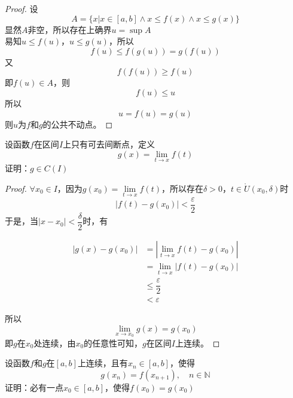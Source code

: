 \begin{proof}

    设
    \[A = \{x| x \in [a, b] \land x \leq f(x) \land x \leq g(x)\}\]
    显然\(A\)非空，所以存在上确界\( u = \sup{A}\) \\
    易知\(u \leq f(u)\)，\(u \leq g(u)\)，所以            
    \[f(u) \leq f(g(u)) = g(f(u))\] 
    又
    \[f(f(u)) \geq f(u)\]
    即\(f(u) \in A\)，则
    \[f(u) \leq u\]
    所以
    \[u = f(u) = g(u)\]
    则\(u\)为\(f\)和\(g\)的公共不动点。

\end{proof}

\begin{proposition}
    
    设函数\(f\)在区间\(I\)上只有可去间断点，定义
    \[g(x) = \lim\limits_{t \to x}{f(t)}\]
    证明：\(g \in C(I)\)

\end{proposition}

\begin{proof}

    \(\forall x_0 \in I\)，因为\(g(x_0) = \lim\limits_{t \to x}{f(t)}\)，所以存在\(\delta > 0\)，\(t \in \mathring{U}(x_0, \delta)\)时
    \[|f(t) - g(x_0)| < \dfrac{\varepsilon}{2}\]
    于是，当\(|x - x_0| < \dfrac{\delta}{2}\)时，有

    \begin{align*}
        |g(x) - g(x_0)| & = \left| \lim\limits_{t \to x}{f(t) - g(x_0)} \right| \\
        & = \lim\limits_{t \to x}{|f(t) - g(x_0)|} \\
        & \leq \dfrac{\varepsilon}{2} \\
        & < \varepsilon 
    \end{align*}

    所以
    \[\lim\limits_{x\to x_0}{g(x)} = g(x_0)\]
    即\(g\)在\(x_0\)处连续，由\(x_0\)的任意性可知，\(g\)在区间\(I\)上连续。

\end{proof}

\begin{proposition}

    设函数\(f\)和\(g\)在\([a, b]\)上连续，且有\(x_n \in [a, b]\)，使得
    \[g(x_n) = f(x_{n + 1}), \quad n \in \mathbb{N}\]
    证明：必有一点\(x_0 \in [a, b]\)，使得\(f(x_0) = g(x_0)\)

\end{proposition}

